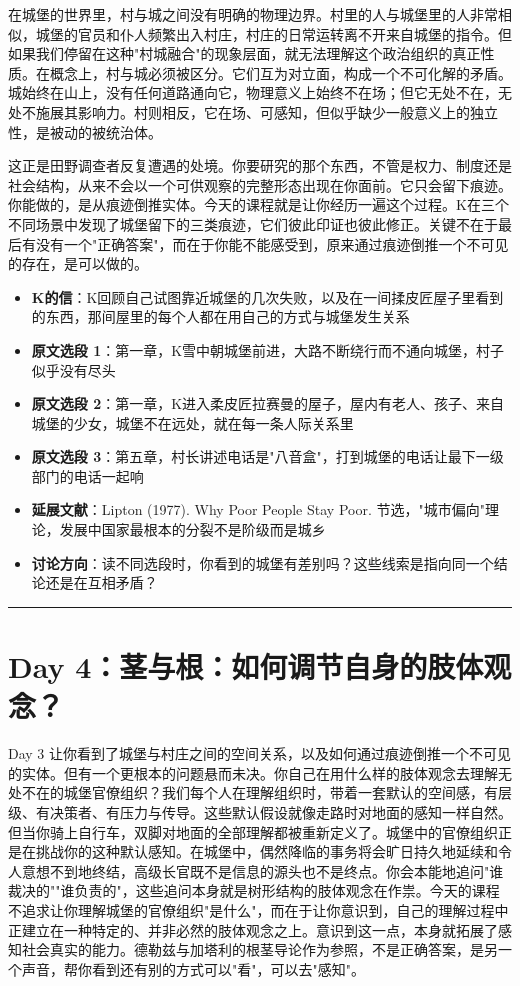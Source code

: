 \documentclass[11pt, a4paper]{ctexart}
\newcommand{\daysep}{\vspace{0.5em}\noindent\rule{\textwidth}{0.2pt}\vspace{0.8em}}
\begin{document}
在城堡的世界里，村与城之间没有明确的物理边界。村里的人与城堡里的人非常相似，城堡的官员和仆人频繁出入村庄，村庄的日常运转离不开来自城堡的指令。但如果我们停留在这种"村城融合"的现象层面，就无法理解这个政治组织的真正性质。在概念上，村与城必须被区分。它们互为对立面，构成一个不可化解的矛盾。城始终在山上，没有任何道路通向它，物理意义上始终不在场；但它无处不在，无处不施展其影响力。村则相反，它在场、可感知，但似乎缺少一般意义上的独立性，是被动的被统治体。

这正是田野调查者反复遭遇的处境。你要研究的那个东西，不管是权力、制度还是社会结构，从来不会以一个可供观察的完整形态出现在你面前。它只会留下痕迹。你能做的，是从痕迹倒推实体。今天的课程就是让你经历一遍这个过程。K在三个不同场景中发现了城堡留下的三类痕迹，它们彼此印证也彼此修正。关键不在于最后有没有一个"正确答案"，而在于你能不能感受到，原来通过痕迹倒推一个不可见的存在，是可以做的。

\vspace{0.5em}

\begin{itemize}
  \item \textbf{K的信}：K回顾自己试图靠近城堡的几次失败，以及在一间揉皮匠屋子里看到的东西，那间屋里的每个人都在用自己的方式与城堡发生关系
  \item \textbf{原文选段 1}：第一章，K雪中朝城堡前进，大路不断绕行而不通向城堡，村子似乎没有尽头
  \item \textbf{原文选段 2}：第一章，K进入柔皮匠拉赛曼的屋子，屋内有老人、孩子、来自城堡的少女，城堡不在远处，就在每一条人际关系里
  \item \textbf{原文选段 3}：第五章，村长讲述电话是"八音盒"，打到城堡的电话让最下一级部门的电话一起响
  \item \textbf{延展文献}：Lipton (1977). Why Poor People Stay Poor. 节选，"城市偏向"理论，发展中国家最根本的分裂不是阶级而是城乡
  \item \textbf{讨论方向}：读不同选段时，你看到的城堡有差别吗？这些线索是指向同一个结论还是在互相矛盾？
\end{itemize}

\daysep

\section*{Day 4：茎与根：如何调节自身的肢体观念？}

Day 3 让你看到了城堡与村庄之间的空间关系，以及如何通过痕迹倒推一个不可见的实体。但有一个更根本的问题悬而未决。你自己在用什么样的肢体观念去理解无处不在的城堡官僚组织？我们每个人在理解组织时，带着一套默认的空间感，有层级、有决策者、有压力与传导。这些默认假设就像走路时对地面的感知一样自然。但当你骑上自行车，双脚对地面的全部理解都被重新定义了。城堡中的官僚组织正是在挑战你的这种默认感知。在城堡中，偶然降临的事务将会旷日持久地延续和令人意想不到地终结，高级长官既不是信息的源头也不是终点。你会本能地追问"谁裁决的""谁负责的"，这些追问本身就是树形结构的肢体观念在作祟。今天的课程不追求让你理解城堡的官僚组织"是什么"，而在于让你意识到，自己的理解过程中正建立在一种特定的、并非必然的肢体观念之上。意识到这一点，本身就拓展了感知社会真实的能力。德勒兹与加塔利的根茎导论作为参照，不是正确答案，是另一个声音，帮你看到还有别的方式可以"看"，可以去"感知"。
\end{document}
